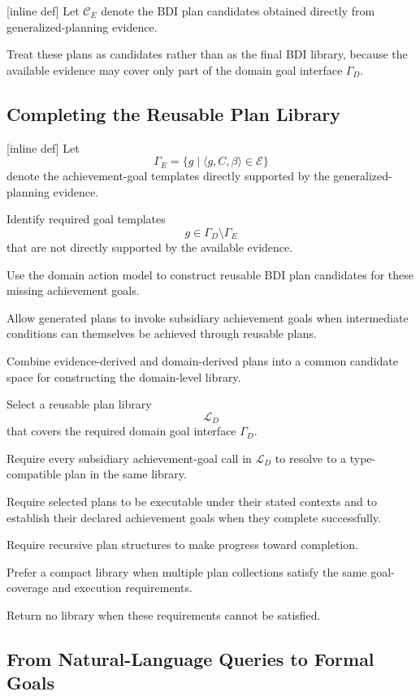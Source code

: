 [inline def] Let $\mathcal{C}_{E}$ denote the BDI plan candidates obtained
directly from generalized-planning evidence.

Treat these plans as candidates rather than as the final BDI library,
because the available evidence may cover only part of the domain goal
interface \(\Gamma_D\).


\subsection{Completing the Reusable Plan Library}

[inline def] Let
\[
\Gamma_E
=
\{g \mid \langle g,C,\beta\rangle\in\mathcal{E}\}
\]
denote the achievement-goal templates directly supported by the
generalized-planning evidence.

Identify required goal templates
\[
g\in\Gamma_D\setminus\Gamma_E
\]
that are not directly supported by the available evidence.

Use the domain action model to construct reusable BDI plan candidates
for these missing achievement goals.

Allow generated plans to invoke subsidiary achievement goals when
intermediate conditions can themselves be achieved through reusable
plans.

Combine evidence-derived and domain-derived plans into a common
candidate space for constructing the domain-level library.

Select a reusable plan library
\[
\mathcal{L}_D
\]
that covers the required domain goal interface \(\Gamma_D\).

Require every subsidiary achievement-goal call in
\(\mathcal{L}_D\) to resolve to a type-compatible plan in the same
library.

Require selected plans to be executable under their stated contexts
and to establish their declared achievement goals when they complete
successfully.

Require recursive plan structures to make progress toward completion.

Prefer a compact library when multiple plan collections satisfy the
same goal-coverage and execution requirements.

Return no library when these requirements cannot be satisfied.


\subsection{From Natural-Language Queries to Formal Goals}

